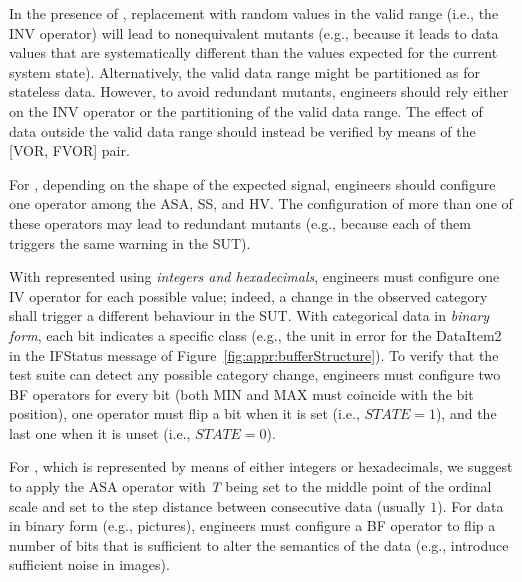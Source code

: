 In the presence of , replacement with random values in the valid range (i.e., the INV operator) will lead to nonequivalent mutants (e.g., because it leads to data values that are systematically different than the values expected for the current system state). Alternatively, the valid data range might be partitioned as for stateless data. However, to avoid redundant mutants, engineers should rely either on the INV operator or the partitioning of the valid data range. 
The effect of data outside the valid data range should instead be verified by means of the [VOR, FVOR] pair.

For , depending on the shape of the expected signal, engineers should configure one operator among the ASA, SS, and HV. The configuration of more than one of these operators may lead to redundant mutants (e.g., because each of them triggers the same warning in the SUT).

With  represented using \emph{integers and hexadecimals}, engineers must configure one IV operator for each possible value; indeed, a change in the observed category shall trigger a different behaviour in the SUT. 
With categorical data in \emph{binary form}, each bit indicates a specific class (e.g., the unit in error for the DataItem2 in the IFStatus message of Figure~\ref{fig:appr:bufferStructure}).  
To verify that the test suite can detect any possible category change, engineers must configure two BF operators for every bit (both MIN and MAX must coincide with the bit position), one operator must flip a bit when it is set (i.e., $\mathit{STATE}=1$), and the last one when it is unset (i.e., $\mathit{STATE}=0$). 

For , which is represented by means of either integers or hexadecimals, we suggest to apply the ASA operator with \emph{T} being set to the middle point of the ordinal scale and \D set to the step distance between consecutive data (usually $1$). For data in binary form (e.g., pictures), engineers must configure a BF operator to flip a number of bits  that is sufficient to alter the semantics of the data (e.g., introduce sufficient noise in images).


